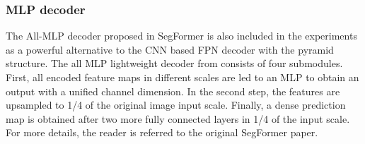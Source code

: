 \subsubsection{MLP decoder}

The All-MLP decoder proposed in SegFormer \parencite{segformer} is also included in the experiments as a powerful alternative to the CNN based FPN decoder with the pyramid structure. The all MLP lightweight decoder from \parencite{segformer} consists of four submodules. First,  all encoded feature maps in different scales are led to an MLP to obtain an output with a unified channel dimension. In the second step, the features are upsampled to 1/4 of the original image input scale. Finally, a dense prediction map is obtained after two more fully connected layers  in 1/4 of the input scale. 
For more details, the reader is referred to the original SegFormer paper.


